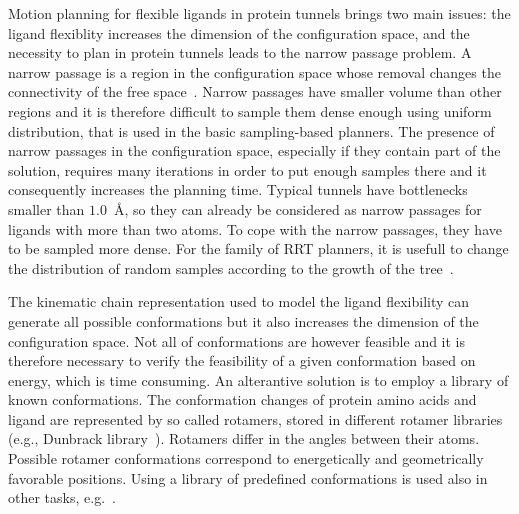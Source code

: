 \documentclass{svmult}
\begin{document}
Motion planning for flexible ligands in protein tunnels brings two main issues: 
the ligand flexiblity increases the dimension of the configuration space, and the necessity to plan in protein tunnels
leads to the narrow passage problem.
A narrow passage is a region in the configuration space whose removal changes the connectivity of the free space~\cite{hannaWIS}.
Narrow passages have smaller volume than other regions and it is therefore difficult to sample them dense enough using uniform distribution, that is used in the basic sampling-based planners.
The presence of narrow passages in the configuration space, especially if they contain part of the solution, requires many iterations
in order to put enough samples there and it consequently increases the planning time.
Typical tunnels have bottlenecks smaller than $1.0$~\AA, so they can already be considered as narrow passages for ligands with more than two atoms.
To cope with the narrow passages, they have to be sampled more dense.
For the family of RRT planners, it is usefull to change the distribution of random samples according to the growth of the tree~\cite{vonasek2009rrt,vonasekphd,denny2016dynamic}.

The kinematic chain representation used to model the ligand flexibility can generate all possible conformations but it also increases the dimension of the configuration space.
Not all of conformations are however feasible and it is therefore necessary to verify the feasibility of a given conformation based on energy, which is time consuming.
An alterantive solution is to employ a library of known conformations.
The conformation changes of protein amino acids and ligand are represented by so called rotamers, stored in different rotamer libraries (e.g., Dunbrack library~\cite{dunbrack}).
Rotamers differ in the angles between their atoms.
Possible rotamer conformations correspond to energetically and geometrically favorable positions.
Using a library of predefined conformations is used also in other tasks, e.g.~\cite{kellogg}.
\end{document}
